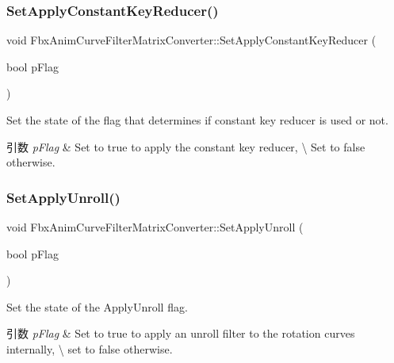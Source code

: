 \subsubsection{\texorpdfstring{Set\+Apply\+Constant\+Key\+Reducer()}{SetApplyConstantKeyReducer()}}
{\footnotesize\ttfamily void Fbx\+Anim\+Curve\+Filter\+Matrix\+Converter\+::\+Set\+Apply\+Constant\+Key\+Reducer (\begin{DoxyParamCaption}\item[{bool}]{p\+Flag }\end{DoxyParamCaption})}

Set the state of the flag that determines if constant key reducer is used or not. 
\begin{DoxyParams}{引数}
{\em p\+Flag} & Set to {\ttfamily true} to apply the constant key reducer, \textbackslash{} Set to {\ttfamily false} otherwise. \\
\hline
\end{DoxyParams}
\mbox{\label{class_fbx_anim_curve_filter_matrix_converter_abcfe379526feec5a8d3ffc9e3e435d66}} 
\subsubsection{\texorpdfstring{Set\+Apply\+Unroll()}{SetApplyUnroll()}}
{\footnotesize\ttfamily void Fbx\+Anim\+Curve\+Filter\+Matrix\+Converter\+::\+Set\+Apply\+Unroll (\begin{DoxyParamCaption}\item[{bool}]{p\+Flag }\end{DoxyParamCaption})}

Set the state of the Apply\+Unroll flag. 
\begin{DoxyParams}{引数}
{\em p\+Flag} & Set to {\ttfamily true} to apply an unroll filter to the rotation curves internally, \textbackslash{} set to {\ttfamily false} otherwise. \\
\hline
\end{DoxyParams}
\mbox{\label{class_fbx_anim_curve_filter_matrix_converter_a5eafea6927cc0698df3a1a9c2cdb3b7d}} 
